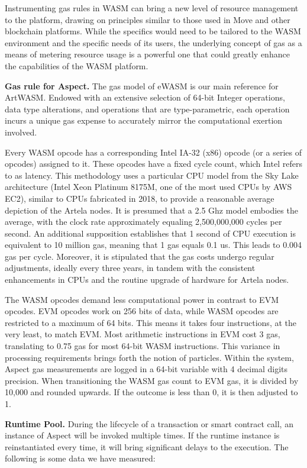 Instrumenting gas rules in WASM can bring a new level of resource management to the platform, drawing on principles similar to those used in Move and other blockchain platforms. While the specifics would need to be tailored to the WASM environment and the specific needs of its users, the underlying concept of gas as a means of metering resource usage is a powerful one that could greatly enhance the capabilities of the WASM platform.

\textbf{Gas rule for Aspect.} The gas model of eWASM is our main reference for ArtWASM. Endowed with an extensive selection of 64-bit Integer operations, data type alterations, and operations that are type-parametric, each operation incurs a unique gas expense to accurately mirror the computational exertion involved.

Every WASM opcode has a corresponding Intel IA-32 (x86) opcode (or a series of opcodes) assigned to it. These opcodes have a fixed cycle count, which Intel refers to as latency. This methodology uses a particular CPU model from the Sky Lake architecture (Intel Xeon Platinum 8175M, one of the most used CPUs by AWS EC2), similar to CPUs fabricated in 2018, to provide a reasonable average depiction of the Artela nodes. It is presumed that a 2.5 Ghz model embodies the average, with the clock rate approximately equaling 2,500,000,000 cycles per second. An additional supposition establishes that 1 second of CPU execution is equivalent to 10 million gas, meaning that 1 gas equals 0.1 us. This leads to 0.004 gas per cycle. Moreover, it is stipulated that the gas costs undergo regular adjustments, ideally every three years, in tandem with the consistent enhancements in CPUs and the routine upgrade of hardware for Artela nodes.

The WASM opcodes demand less computational power in contrast to EVM opcodes. EVM opcodes work on 256 bits of data, while WASM opcodes are restricted to a maximum of 64 bits. This means it takes four instructions, at the very least, to match EVM. Most arithmetic instructions in EVM cost 3 gas, translating to 0.75 gas for most 64-bit WASM instructions. This variance in processing requirements brings forth the notion of particles. Within the system, Aspect gas measurements are logged in a 64-bit variable with 4 decimal digits precision. When transitioning the WASM gas count to EVM gas, it is divided by 10,000 and rounded upwards. If the outcome is less than 0, it is then adjusted to 1.

\textbf{Runtime Pool.} During the lifecycle of a transaction or smart contract call, an instance of Aspect will be invoked multiple times. If the runtime instance is reinstantiated every time, it will bring significant delays to the execution. The following is some data we have measured:


